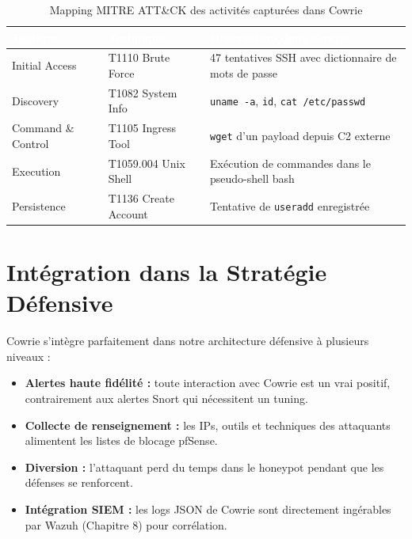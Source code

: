 \documentclass[12pt,a4paper,openany]{report}
\begin{document}
\begin{table}[H]
    \centering
    \renewcommand{\arraystretch}{1.8}
    \setlength{\tabcolsep}{10pt}
    \setlength{\arrayrulewidth}{0.8pt}
    \begin{tabularx}{\textwidth}{|p{2.5cm}|p{3cm}|X|}
        \arrayrulecolor{tableborder}
        \hline
        \rowcolor{tableheadbg}
        \textcolor{white}{\textbf{Tactique}} &
        \textcolor{white}{\textbf{Technique}} &
        \textcolor{white}{\textbf{Observation dans Cowrie}} \\
        \hline
        \rowcolor{tablerowalt}
        Initial Access & T1110 Brute Force & 47 tentatives SSH avec dictionnaire de mots de passe \\
        \hline
        Discovery & T1082 System Info & \texttt{uname -a}, \texttt{id}, \texttt{cat /etc/passwd} \\
        \hline
        \rowcolor{tablerowalt}
        Command \& Control & T1105 Ingress Tool & \texttt{wget} d'un payload depuis C2 externe \\
        \hline
        Execution & T1059.004 Unix Shell & Exécution de commandes dans le pseudo-shell bash \\
        \hline
        \rowcolor{tablerowalt}
        Persistence & T1136 Create Account & Tentative de \texttt{useradd} enregistrée \\
        \hline
    \end{tabularx}
    \caption{Mapping MITRE ATT\&CK des activités capturées dans Cowrie}
    \label{tab:mitre-cowrie}
\end{table}

\section{Intégration dans la Stratégie Défensive}

Cowrie s'intègre parfaitement dans notre architecture défensive à plusieurs niveaux :
\begin{itemize}
    \item \textbf{Alertes haute fidélité :} toute interaction avec Cowrie est un vrai positif,
          contrairement aux alertes Snort qui nécessitent un tuning.
    \item \textbf{Collecte de renseignement :} les IPs, outils et techniques des attaquants
          alimentent les listes de blocage pfSense.
    \item \textbf{Diversion :} l'attaquant perd du temps dans le honeypot pendant que les
          défenses se renforcent.
    \item \textbf{Intégration SIEM :} les logs JSON de Cowrie sont directement ingérables
          par Wazuh (Chapitre 8) pour corrélation.
\end{itemize}
\end{document}
